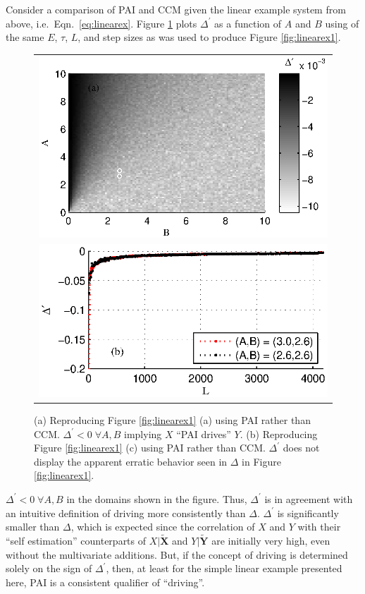 \documentclass[twocolumn,aps,pre,groupedaddress]{revtex4-1}
\begin{document}
Consider a comparison of PAI and CCM given the linear example system from above, i.e.\ Eqn.\ \ref{eq:linearex}.  Figure \ref{fig:linearExPAI} plots $\Delta^\prime$ as a function of $A$ and $B$ using of the same $E$, $\tau$, $L$, and step sizes as was used to produce Figure \ref{fig:linearex1}.
\begin{figure}[ht]
\begin{tabular}{c}
\includegraphics[scale=0.8]{LinearExPAI.eps} \\
\includegraphics[scale=0.8]{LinearExPAIChangeL.eps} \\
\end{tabular}
\caption{(a) Reproducing Figure \ref{fig:linearex1} (a) using PAI rather than CCM.  $\Delta^\prime<0\;\forall A,B$ implying $X$ ``PAI drives'' $Y$. (b) Reproducing Figure \ref{fig:linearex1} (c) using PAI rather than CCM.  $\Delta^\prime$ does not display the apparent erratic behavior seen in $\Delta$ in Figure \ref{fig:linearex1}.}
\label{fig:linearExPAI}
\end{figure}
$\Delta^\prime<0\;\forall A,B$ in the domains shown in the figure.  Thus, $\Delta^\prime$ is in agreement with an intuitive definition of driving more consistently than $\Delta$.  $\Delta^\prime$ is significantly smaller than $\Delta$, which is expected since the correlation of $X$ and $Y$ with their ``self estimation'' counterparts of $X|\tilde{\mathbf{X}}$ and $Y|\tilde{\mathbf{Y}}$ are initially very high, even without the multivariate additions.  But, if the concept of driving is determined solely on the sign of $\Delta^\prime$, then, at least for the simple linear example presented here, PAI is a consistent qualifier of ``driving''.
\end{document}
